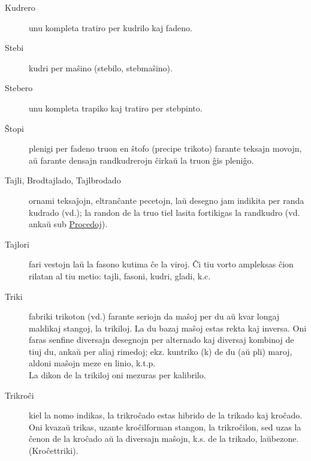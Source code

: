 \begin{description}
\item[Kudrero]

 unu kompleta tratiro per kudrilo kaj fadeno.

\item[Stebi]

 kudri per maŝino (stebilo, stebmaŝino).

\item[Stebero]

 unu kompleta trapiko kaj tratiro per stebpinto.

\item[Ŝtopi]

 plenigi per fadeno truon en ŝtofo (precipe trikoto) farante teksajn movojn, aŭ farante densajn randkudrerojn ĉirkaŭ la truon ĝis pleniĝo.

\item[Tajli, Brodtajlado, Tajlbrodado]

 ornami teksaĵojn, eltranĉante pecetojn, laŭ desegno jam indikita per randa kudrado (vd.); la randon de la truo tiel lasita fortikigas la randkudro (vd. ankaŭ sub \hyperlink{Procedoj}{Procedoj}).  

\item[Tajlori]

 fari vestojn laŭ la fasono kutima ĉe la viroj. Ĉi tiu vorto ampleksas ĉion rilatan al tiu metio: tajli, fasoni, kudri, gladi, k.c.

\item[Triki]

 fabriki trikoton (vd.) farante seriojn da maŝoj per du aŭ kvar longaj maldikaj stangoj, la trikiloj. La du bazaj maŝoj estas rekta kaj inversa. Oni faras senfine diversajn desegnojn per alternado kaj diversaj kombinoj de tiuj du, ankaŭ per aliaj rimedoj; ekz. kuntriko (k) de du (aŭ pli) maroj, aldoni maŝojn meze en linio, k.t.p.\\
La dikon de la trikiloj oni mezuras per kalibrilo.

\item[\ast\space Trikroĉi]

 kiel la nomo indikas, la trikroĉado estas hibrido de la trikado kaj kroĉado. Oni kvazaŭ trikas, uzante kroĉilforman stangon, la trikroĉilon, sed uzas la ĉenon de la kroĉado aŭ la diversajn maŝojn, k.s. de la trikado, laŭbezone. (Kroĉettriki).
\end{description}

